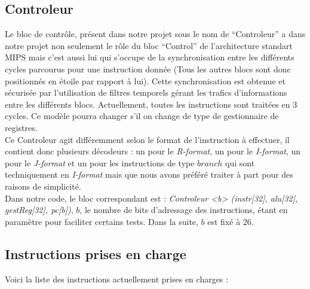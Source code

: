 \documentclass[13pt]{article}
\begin{document}
\subsection{Controleur}

Le bloc de contrôle, présent dans notre projet sous le nom 
de ``Controleur''
a dans notre projet non 
seulement le rôle du bloc ``Control''
de l'architecture standart MIPS 
mais c'est aussi lui qui s'occupe
de la synchronisation entre 
les différents cycles parcourus pour une
instruction donnée (Tous les autres blocs
sont donc positionnés en étoile par rapport 
à lui). Cette synchronisation
est obtenue et sécurisée par l'utilisation de filtres
temporels gérant les trafics d'informations entre les
différents blocs.
Actuellement, toutes les instructions sont traitées en
3 cycles. Ce modèle pourra changer s'il on change
de type de gestionnaire de registres. \\

Ce Controleur agit différemment selon le format de 
l'instruction à effectuer, il contient donc plusieurs
décodeurs : un pour le \textit{R-format}, un pour le 
\textit{I-format},
un pour le \textit{J-format} et un pour les instructions
de type $branch$ qui sont techniquement en 
\textit{I-format} mais que
nous avons préféré traiter à part pour des raisons de
simplicité.\\

Dans notre code, le bloc correspondant est :
\textit{Controleur <b> (instr[32], alu[32], 
gestReg[32], pc[b])}, $b$, le nombre de bits
d'adressage des instructions, étant en paramètre
pour faciliter certains tests. Dans la suite, $b$ est
fixé à 26. 


\subsection{Instructions prises en charge}

Voici la liste des instructions actuellement prises en 
charges : 
\end{document}
